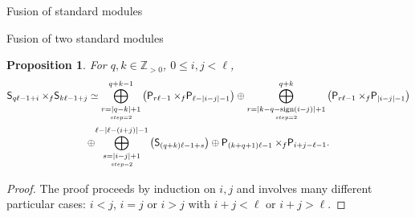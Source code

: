 \documentclass[reqno]{amsart}
\newtheorem{Prop}[Thm]{Proposition}
\newcommand{\ds}[1]{\mathsf S_{#1}}
\newcommand{\dP}[1]{\mathsf P_{#1}}
\newcommand{\xf}{\times\hspace{-0.27em}_f}
\newcommand{\lc}{\ell}
\begin{document}
\begin{section}{Fusion of standard modules}
\begin{subsection}{Fusion of two standard modules}
\begin{Prop}
For $q,k\in \mathbb{Z}_{>0}$, $0 \leq i,j<\lc$,
\begin{multline}\label{eq:fusionStand}
\ds{q \lc-1 +i} \xf \ds{k \lc -1 +j} \simeq \overset{q+k-1}{\underset{\underset{step =2}{r = |q-k|+1}}{\bigoplus}}\left(\dP{r \lc -1} \xf \dP{\lc-|i-j|-1} \right) \oplus \overset{q+k}{\underset{\underset{step =2}{r = |k-q-\text{sign}(i-j)| + 1}}{\bigoplus}}\left(\dP{r \lc -1} \xf \dP{|i-j|-1} \right) \\
\oplus  \overset{\lc -|\lc-(i+j)|-1}{\underset{\underset{step =2}{s = |i-j|+1}}{\bigoplus}}\left(\ds{(q+k) \lc -1 + s} \right) \oplus \dP{(k+q+1)\lc -1} \xf \dP{i+j - \lc -1}.
\end{multline}
\end{Prop}
\begin{proof}
The proof proceeds by induction on $i, j$ and involves many different particular cases: $i<j$, $i=j$ or $i>j$ with $i+j < \lc$ or $i+j>\lc$.


\end{proof}
\end{subsection}
\end{section}
\end{document}
